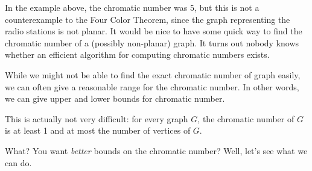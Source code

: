 \documentclass[10pt,]{book}
\theoremstyle{plain}
\theoremstyle{definition}
\theoremstyle{definition}
\theoremstyle{definition}
\numberwithin{equation}{chapter}
\begin{document}
\hypertarget{p-369}{}%
In the example above, the chromatic number was 5, but this is not a counterexample to the Four Color Theorem, since the graph representing the radio stations is not planar. It would be nice to have some quick way to find the chromatic number of a (possibly non-planar) graph. It turns out nobody knows whether an efficient algorithm for computing chromatic numbers exists.%
\par
\hypertarget{p-370}{}%
While we might not be able to find the exact chromatic number of graph easily, we can often give a reasonable range for the chromatic number. In other words, we can give upper and lower bounds for chromatic number.%
\par
\hypertarget{p-371}{}%
This is actually not very difficult: for every graph \(G\), the chromatic number of \(G\) is at least 1 and at most the number of vertices of \(G\).%
\par
\hypertarget{p-372}{}%
What? You want \emph{better} bounds on the chromatic number? Well, let's see what we can do.%
\end{document}
